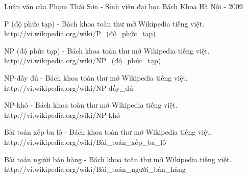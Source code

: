 \documentclass[14pt]{hcmutarticle}
\begin{document}
\begin{thebibliography}{}
\bibitem{}
Luận văn của Phạm Thái Sơn - Sinh viên đại học Bách Khoa Hà Nội - 2009

\bibitem{}
P (độ phức tạp) - Bách khoa toàn thư mở Wikipedia tiếng việt.
http://vi.wikipedia.org/wiki/P\_(độ\_phức\_tạp)

\bibitem{}
NP (độ phức tạp) - Bách khoa toàn thư mở Wikipedia tiếng việt.
http://vi.wikipedia.org/wiki/NP\_(độ\_phức\_tạp)

\bibitem{}
NP-đầy đủ - Bách khoa toàn thư mở Wikipedia tiếng việt.
http://vi.wikipedia.org/wiki/NP-đầy\_đủ

\bibitem{}
NP-khó - Bách khoa toàn thư mở Wikipedia tiếng việt.
http://vi.wikipedia.org/wiki/NP-khó

Bài toán xếp ba lô - Bách khoa toàn thư mở Wikipedia tiếng việt.
http://vi.wikipedia.org/wiki/Bài\_toán\_xếp\_ba\_lô

Bài toán người bán hàng - Bách khoa toàn thư mở Wikipedia tiếng việt.
http://vi.wikipedia.org/wiki/Bài\_toán\_người\_bán\_hàng


\end{thebibliography}
\end{document}
